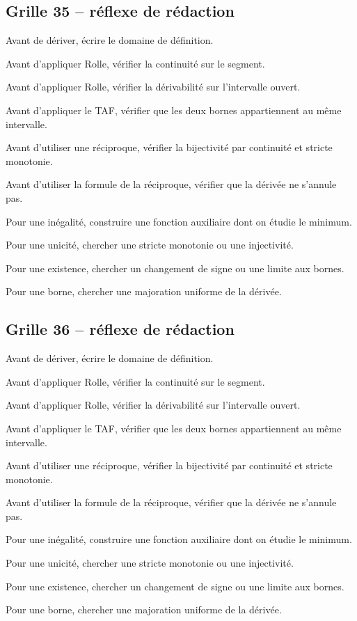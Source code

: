 \documentclass[11pt,a4paper]{article}
\begin{document}
\subsection*{Grille 35 -- réflexe de rédaction}

\begin{methodebox}

Avant de dériver, écrire le domaine de définition.

Avant d'appliquer Rolle, vérifier la continuité sur le segment.

Avant d'appliquer Rolle, vérifier la dérivabilité sur l'intervalle ouvert.

Avant d'appliquer le TAF, vérifier que les deux bornes appartiennent au même intervalle.

Avant d'utiliser une réciproque, vérifier la bijectivité par continuité et stricte monotonie.

Avant d'utiliser la formule de la réciproque, vérifier que la dérivée ne s'annule pas.

Pour une inégalité, construire une fonction auxiliaire dont on étudie le minimum.

Pour une unicité, chercher une stricte monotonie ou une injectivité.

Pour une existence, chercher un changement de signe ou une limite aux bornes.

Pour une borne, chercher une majoration uniforme de la dérivée.

\end{methodebox}

\subsection*{Grille 36 -- réflexe de rédaction}

\begin{methodebox}

Avant de dériver, écrire le domaine de définition.

Avant d'appliquer Rolle, vérifier la continuité sur le segment.

Avant d'appliquer Rolle, vérifier la dérivabilité sur l'intervalle ouvert.

Avant d'appliquer le TAF, vérifier que les deux bornes appartiennent au même intervalle.

Avant d'utiliser une réciproque, vérifier la bijectivité par continuité et stricte monotonie.

Avant d'utiliser la formule de la réciproque, vérifier que la dérivée ne s'annule pas.

Pour une inégalité, construire une fonction auxiliaire dont on étudie le minimum.

Pour une unicité, chercher une stricte monotonie ou une injectivité.

Pour une existence, chercher un changement de signe ou une limite aux bornes.

Pour une borne, chercher une majoration uniforme de la dérivée.

\end{methodebox}
\end{document}
